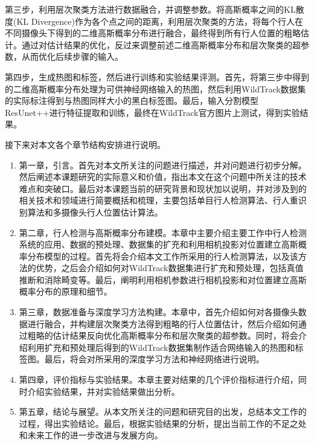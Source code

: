 第三步，利用层次聚类方法进行数据融合，并调整参数。将高斯概率之间的KL散度(KL Divergence)作为各个点之间的距离，利用层次聚类的方法，将每个行人在不同摄像头下得到的二维高斯概率分布进行融合，最终得到所有行人位置的粗略估计。通过对估计结果的优化，反过来调整前述二维高斯概率分布和层次聚类的超参数，从而优化后续步骤的输入。

第四步，生成热图和标签，然后进行训练和实验结果评测。首先，将第三步中得到的二维高斯概率分布处理为可供神经网络输入的热图，然后利用WildTrack数据集的实际标注得到与热图同样大小的黑白标签图。最后，输入分割模型ResUnet++\cite{jha2019resunet}进行特征提取和训练，最终在WildTrack官方图片上测试，得到实验结果。

接下来对本文各个章节结构安排进行说明。

\begin{enumerate}
  \item 第一章，引言。首先对本文所关注的问题进行描述，并对问题进行初步分解。然后阐述本课题研究的实际意义和价值，指出本文在这个问题中所关注的技术难点和突破口。最后对本课题当前的研究背景和现状加以说明，并对涉及到的相关技术和领域进行简要概括和梳理，主要包括单目行人检测算法、行人重识别算法和多摄像头行人位置估计算法。
  \item 第二章，行人检测与高斯概率分布建模。本章中主要介绍主要工作中行人检测系统的应用、数据的预处理、数据集的扩充和利用相机投影对位置建立高斯概率分布模型的过程。首先将会介绍本文工作所采用的行人检测算法，以及该方法的优势，之后会介绍如何对WildTrack数据集进行扩充和预处理，包括真值推断和消除畸变等。最后，阐明利用相机参数进行相机投影和对位置建立高斯概率分布的原理和细节。
  \item 第三章，数据准备与深度学习方法构建。本章中，首先介绍如何对各摄像头数据进行融合，并构建层次聚类方法得到粗略的行人位置估计，然后介绍如何通过粗略的估计结果反向优化高斯概率分布和层次聚类的超参数。同时，将会介绍利用扩充和预处理后得到的WildTrack数据集制作适合网络输入的热图和标签图。最后，将会对所采用的深度学习方法和神经网络进行说明。
  \item 第四章，评价指标与实验结果。本章主要对结果的几个评价指标进行介绍，同时介绍实验结果，并对实验结果做出分析。
  \item 第五章，结论与展望。从本文所关注的问题和研究目的出发，总结本文工作的过程，得出实验结论。最后，根据实验结果的分析，提出当前工作的不足之处和未来工作的进一步改进与发展方向。
\end{enumerate}
